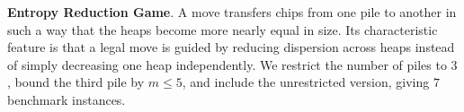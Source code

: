\documentclass[review]{elsarticle}
\newcommand{\set}[1]{\{ #1 \}}
\newcommand{\tuple}[1]{\langle {#1} \rangle}
\newcommand{\true}{\top}
\newcommand{\statevar}{\mathcal{X}}
\newcommand{\act}{\mathcal{A}}
\newcommand{\constraint}{\mathcal{C}}
\newcommand{\estate}{\mathcal{E}}
\newcommand{\pre}{\mathtt{pre}}
\newcommand{\eff}{\mathtt{eff}}
\begin{document}
\textbf{Entropy Reduction Game}. A move transfers chips from one pile to another in such a way that the heaps become more nearly equal in size.
Its characteristic feature is that a legal move is guided by reducing dispersion across heaps instead of simply decreasing one heap independently.
We restrict the number of piles to $3$, bound the third pile by $m \le 5$, and include the unrestricted version, giving $7$ benchmark instances.
\end{document}
